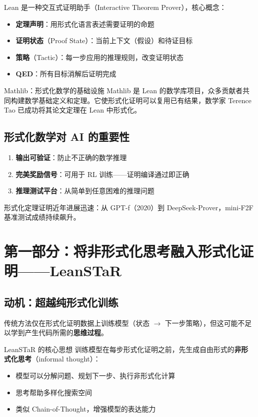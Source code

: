 \documentclass[a4paper]{article}
\begin{document}
Lean 是一种交互式证明助手（Interactive Theorem Prover），核心概念：
\begin{itemize}
    \item \textbf{定理声明}：用形式化语言表述需要证明的命题
    \item \textbf{证明状态}（Proof State）：当前上下文（假设）和待证目标
    \item \textbf{策略}（Tactic）：每一步应用的推理规则，改变证明状态
    \item \textbf{QED}：所有目标消解后证明完成
\end{itemize}

\begin{knowledgebox}{Mathlib：形式化数学的基础设施}
Mathlib 是 Lean 的数学库项目，众多贡献者共同构建数学基础定义和定理。它使形式化证明可以复用已有结果，数学家 Terence Tao 已成功将其论文定理在 Lean 中形式化。
\end{knowledgebox}

\subsection{形式化数学对 AI 的重要性}

\begin{enumerate}
    \item \textbf{输出可验证}：防止不正确的数学推理
    \item \textbf{完美奖励信号}：可用于 RL 训练——证明编译通过即正确
    \item \textbf{推理测试平台}：从简单到任意困难的推理问题
\end{enumerate}

形式化定理证明近年进展迅速：从 GPT-f（2020）到 DeepSeek-Prover，mini-F2F 基准测试成绩持续飙升。

\section{第一部分：将非形式化思考融入形式化证明——LeanSTaR}

\subsection{动机：超越纯形式化训练}

传统方法仅在形式化证明数据上训练模型（状态 $\to$ 下一步策略），但这可能不足以学到产生代码所需的\textbf{思维过程}。

\begin{importantbox}{LeanSTaR 的核心思想}
训练模型在每步形式化证明之前，先生成自由形式的\textbf{非形式化思考}（informal thought）：
\begin{itemize}
    \item 模型可以分解问题、规划下一步、执行非形式化计算
    \item 思考帮助多样化搜索空间
    \item 类似 Chain-of-Thought，增强模型的表达能力
\end{itemize}
\end{importantbox}
\end{document}
